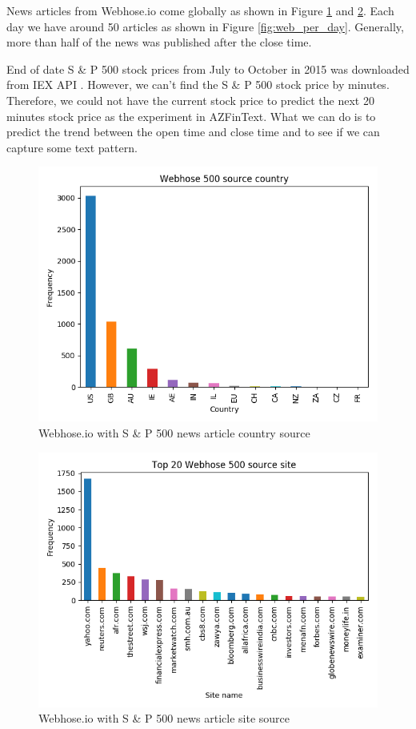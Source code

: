 \documentclass[sigconf]{acmart}
\begin{document}
News articles from Webhose.io come globally as shown in Figure \ref{fig:web_contry} and \ref{fig:web_site}. Each day we have around 50 articles as shown in Figure \ref{fig:web_per_day}.
Generally, more than half of the news was published after the close time.

End of date S \& P 500 stock prices from July to October in 2015 was downloaded from IEX API \cite{IEX}. However, we can't find the S \& P 500 stock price by minutes. Therefore, we could not
have the current stock price to predict the next 20 minutes stock price as the experiment in AZFinText. What we can do is to predict the trend between the open time and close time and to see
if we can capture some text pattern.

\begin{figure}
  \includegraphics[width=\linewidth]{../../picture/webhose_500_country.png}
  \caption{Webhose.io with S \& P 500 news article country source}
  \label{fig:web_contry}
\end{figure}

\begin{figure}
  \includegraphics[width=\linewidth]{../../picture/webhose_500_site.png}
  \caption{Webhose.io with S \& P 500 news article site source}
  \label{fig:web_site}
\end{figure}
\end{document}
